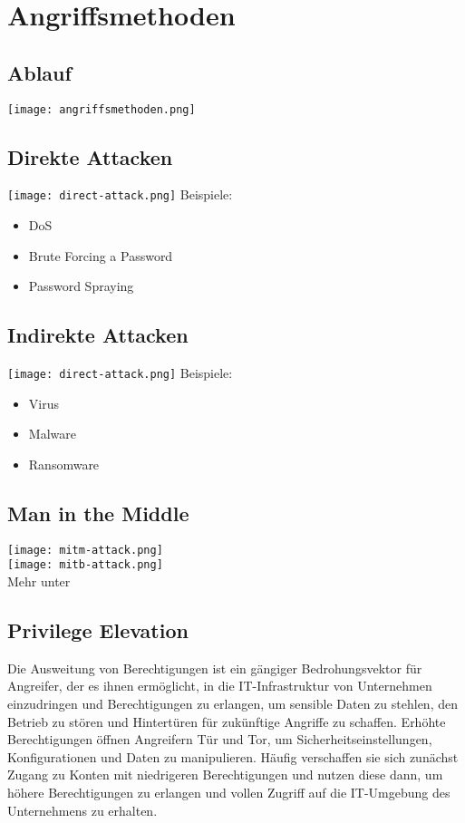 \section{Angriffsmethoden}
\subsection{Ablauf}
\texttt{[image: angriffsmethoden.png]}

\subsection{Direkte Attacken}
\texttt{[image: direct-attack.png]}
Beispiele:
\begin{itemize}
  \item DoS
  \item Brute Forcing a Password
  \item Password Spraying
\end{itemize}

\subsection{Indirekte Attacken}
\texttt{[image: direct-attack.png]}
Beispiele:
\begin{itemize}
  \item Virus
  \item Malware 
  \item Ransomware
\end{itemize}

\subsection{Man in the Middle}
\texttt{[image: mitm-attack.png]}\\
\texttt{[image: mitb-attack.png]}\\
Mehr unter %

\subsection{Privilege Elevation}
Die Ausweitung von Berechtigungen ist ein gängiger Bedrohungsvektor für Angreifer, der es ihnen ermöglicht, in die IT-Infrastruktur von Unternehmen einzudringen und Berechtigungen zu erlangen, um sensible Daten zu stehlen, den Betrieb zu stören und Hintertüren für zukünftige Angriffe zu schaffen. 
Erhöhte Berechtigungen öffnen Angreifern Tür und Tor, um Sicherheitseinstellungen, Konfigurationen und Daten zu manipulieren. Häufig verschaffen sie sich zunächst Zugang zu Konten mit niedrigeren Berechtigungen und nutzen diese dann, um höhere Berechtigungen zu erlangen und vollen Zugriff auf die IT-Umgebung des Unternehmens zu erhalten.\\

